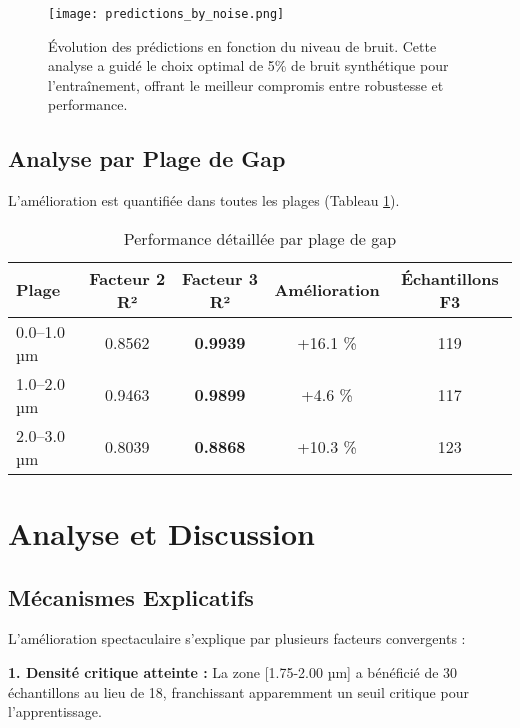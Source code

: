 \documentclass[11pt,a4paper,twocolumn]{article}
\begin{document}
\begin{figure}[h]
\centering
\texttt{[image: predictions\_by\_noise.png]}
\caption{Évolution des prédictions en fonction du niveau de bruit. Cette analyse a guidé le choix optimal de 5\% de bruit synthétique pour l'entraînement, offrant le meilleur compromis entre robustesse et performance.}
\label{fig:noise_analysis}
\end{figure}

\subsection{Analyse par Plage de Gap}

L'amélioration est quantifiée dans toutes les plages (Tableau \ref{tab:ranges}).

\begin{table}[H]
  \centering
  \caption{Performance détaillée par plage de gap}
  \label{tab:ranges}
  \begin{adjustbox}{max width=\columnwidth}
    \begin{tabular}{@{}lcccc@{}}
      \toprule
      \textbf{Plage} & \textbf{Facteur 2 R²} & \textbf{Facteur 3 R²} & \textbf{Amélioration} & \textbf{Échantillons F3} \\
      \midrule
      0.0--1.0 µm & 0.8562 & \textbf{0.9939} & +16.1 \% & 119 \\
      1.0--2.0 µm & 0.9463 & \textbf{0.9899} & +4.6 \%  & 117 \\
      2.0--3.0 µm & 0.8039 & \textbf{0.8868} & +10.3 \% & 123 \\
      \bottomrule
    \end{tabular}
  \end{adjustbox}
\end{table}

\section{Analyse et Discussion}

\subsection{Mécanismes Explicatifs}

L'amélioration spectaculaire s'explique par plusieurs facteurs convergents :

\textbf{1. Densité critique atteinte :} La zone [1.75-2.00 µm] a bénéficié de 30 échantillons au lieu de 18, franchissant apparemment un seuil critique pour l'apprentissage.
\end{document}

